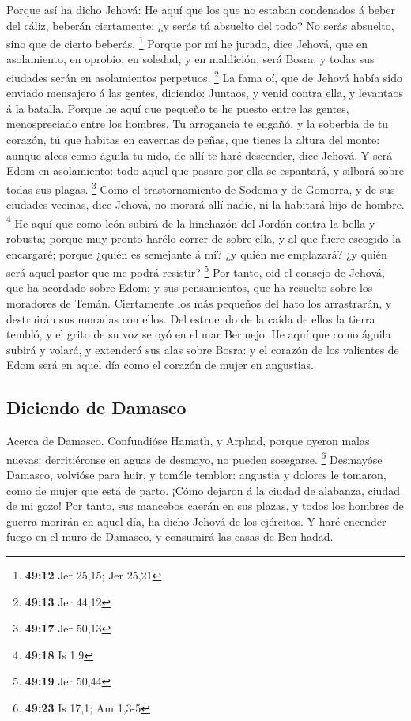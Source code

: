  Porque así ha dicho Jehová: He aquí que los que no estaban
condenados á beber del cáliz, beberán ciertamente; ¿y serás tú absuelto
del todo? No serás absuelto, sino que de cierto beberás. \footnote{\textbf{49:12}
  Jer 25,15; Jer 25,21}  Porque por mí he jurado, dice
Jehová, que en asolamiento, en oprobio, en soledad, y en maldición, será
Bosra; y todas sus ciudades serán en asolamientos perpetuos. \footnote{\textbf{49:13}
  Jer 44,12}  La fama oí, que de Jehová había sido enviado
mensajero á las gentes, diciendo: Juntaos, y venid contra ella, y
levantaos á la batalla.  Porque he aquí que pequeño te he
puesto entre las gentes, menospreciado entre los hombres. 
Tu arrogancia te engañó, y la soberbia de tu corazón, tú que habitas en
cavernas de peñas, que tienes la altura del monte: aunque alces como
águila tu nido, de allí te haré descender, dice Jehová.  Y
será Edom en asolamiento: todo aquel que pasare por ella se espantará, y
silbará sobre todas sus plagas. \footnote{\textbf{49:17} Jer 50,13}
 Como el trastornamiento de Sodoma y de Gomorra, y de sus
ciudades vecinas, dice Jehová, no morará allí nadie, ni la habitará hijo
de hombre. \footnote{\textbf{49:18} Is 1,9}  He aquí que
como león subirá de la hinchazón del Jordán contra la bella y robusta;
porque muy pronto harélo correr de sobre ella, y al que fuere escogido
la encargaré; porque ¿quién es semejante á mí? ¿y quién me emplazará? ¿y
quién será aquel pastor que me podrá resistir? \footnote{\textbf{49:19}
  Jer 50,44}  Por tanto, oid el consejo de Jehová, que ha
acordado sobre Edom; y sus pensamientos, que ha resuelto sobre los
moradores de Temán. Ciertamente los más pequeños del hato los
arrastrarán, y destruirán sus moradas con ellos.  Del
estruendo de la caída de ellos la tierra tembló, y el grito de su voz se
oyó en el mar Bermejo.  He aquí que como águila subirá y
volará, y extenderá sus alas sobre Bosra: y el corazón de los valientes
de Edom será en aquel día como el corazón de mujer en angustias.

\hypertarget{diciendo-de-damasco}{%
\subsection{Diciendo de Damasco}\label{diciendo-de-damasco}}

 Acerca de Damasco. Confundióse Hamath, y Arphad, porque
oyeron malas nuevas: derritiéronse en aguas de desmayo, no pueden
sosegarse. \footnote{\textbf{49:23} Is 17,1; Am 1,3-5} 
Desmayóse Damasco, volvióse para huir, y tomóle temblor: angustia y
dolores le tomaron, como de mujer que está de parto.  ¡Cómo
dejaron á la ciudad de alabanza, ciudad de mi gozo!  Por
tanto, sus mancebos caerán en sus plazas, y todos los hombres de guerra
morirán en aquel día, ha dicho Jehová de los ejércitos.  Y
haré encender fuego en el muro de Damasco, y consumirá las casas de
Ben-hadad.

